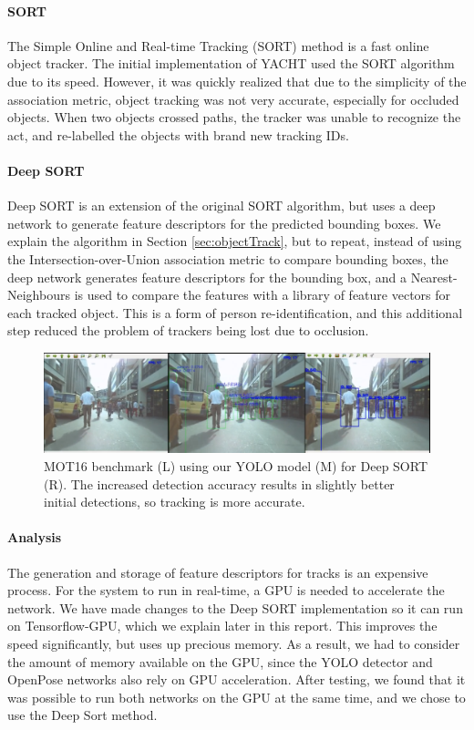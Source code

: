 \paragraph{SORT}  The Simple Online and Real-time Tracking (SORT) method is a fast online object tracker. The initial implementation of YACHT used the SORT algorithm due to its speed. However, it was quickly realized that due to the simplicity of the association metric, object tracking was not very accurate, especially for occluded objects. When two objects crossed paths, the tracker was unable to recognize the act, and re-labelled the objects with brand new tracking IDs.

\paragraph{Deep SORT} Deep SORT is an extension of the original SORT algorithm, but uses a deep network to generate feature descriptors for the predicted bounding boxes. We explain the algorithm in Section \ref{sec:objectTrack}, but to repeat, instead of using the Intersection-over-Union association metric to compare bounding boxes, the deep network generates feature descriptors for the bounding box, and a Nearest-Neighbours is used to compare the features with a library of feature vectors for each tracked object. This is a form of person re-identification, and this additional step reduced the problem of trackers being lost due to occlusion.

\begin{figure}[ht]
	\centering
	\includegraphics[width=1.0\linewidth]{img/chapter4_analysis/deepSortMOT.png}
	\caption{MOT16 benchmark \cite{Milan} (L) using our YOLO model (M) for Deep SORT (R). The increased detection accuracy results in slightly better initial detections, so tracking is more accurate.}
	\label{fig:deepSortMOT}
	\vspace{-1\baselineskip}
\end{figure}

\paragraph{Analysis} The generation and storage of feature descriptors for tracks is an expensive process. For the system to run in real-time, a GPU is needed to accelerate the network. We have made changes to the Deep SORT implementation so it can run on Tensorflow-GPU, which we explain later in this report. This improves the speed significantly, but uses up precious memory. As a result, we had to consider the amount of memory available on the GPU, since the YOLO detector and OpenPose networks also rely on GPU acceleration. After testing, we found that it was possible to run both networks on the GPU at the same time, and we chose to use the Deep Sort method.

